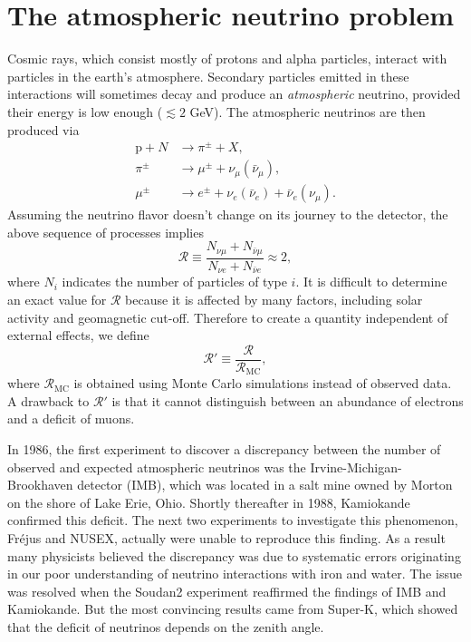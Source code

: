 \section{The atmospheric neutrino problem}
Cosmic rays, which consist mostly of protons and alpha particles, interact with
particles in the earth's atmosphere. Secondary particles emitted in these
interactions will sometimes decay and produce an {\it atmospheric} neutrino,
provided their energy is low enough ($\lesssim2$ GeV). The atmospheric neutrinos
are then produced via
\begin{equation}
  \begin{aligned}
    \text{p}+N&\to\pi^\pm+X, \\
    \pi^\pm&\to\mu^\pm+\nu_\mu(\bar{\nu}_\mu), \\
    \mu^\pm&\to e^\pm+\nu_e(\bar{\nu}_e)+\bar{\nu}_e(\nu_\mu).
  \end{aligned}
\end{equation}
Assuming the neutrino flavor doesn't change on its journey to the detector,
the above sequence of processes implies
\begin{equation}
  \mathcal{R}\equiv\frac{N_{\nu\mu}+N_{\bar{\nu}\mu}}
                           {N_{\nu e}+N_{\bar{\nu}e}}\approx2,
\end{equation}
where $N_i$ indicates the number of particles of type $i$.
It is difficult to determine an exact value for $\mathcal{R}$ because it is
affected by many factors, including solar activity and geomagnetic cut-off.
Therefore to create a quantity independent of external effects, we define
\begin{equation}
  \mathcal{R}'\equiv\frac{\mathcal{R}}{\mathcal{R}_\text{MC}},
\end{equation}
where $\mathcal{R}_\text{MC}$ is obtained using Monte Carlo simulations instead
of observed data. A drawback to $\mathcal{R}'$ is that it cannot distinguish
between an abundance of electrons and a deficit of muons.

In 1986, the first experiment to discover a discrepancy between the number of
observed and expected atmospheric neutrinos was the Irvine-Michigan-Brookhaven
detector (IMB), which was located in a salt mine owned by Morton on 
the shore of Lake
Erie, Ohio.  Shortly thereafter in 1988, Kamiokande confirmed this deficit.
The next two experiments to investigate this phenomenon, Fr\'ejus and NUSEX,
actually were unable to reproduce this finding. As a result many physicists
believed the discrepancy was due to systematic errors originating in our poor
understanding of neutrino interactions with iron and water. The issue was
resolved when the Soudan2 experiment reaffirmed the findings of IMB and
Kamiokande. But the most convincing results came from Super-K, which showed
that the deficit of neutrinos depends on the zenith angle.

